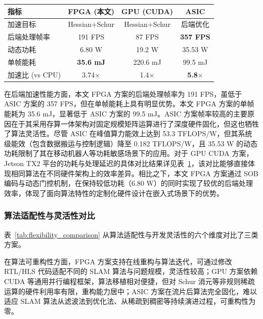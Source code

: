 \begin{table}[h!t]
\centering
{}
\label{tab:performance_comparison}
\scriptsize
\begin{tabular}{lccc}
\toprule
指标 & FPGA (本文) & GPU (CUDA) & ASIC\cite{Li2024SLAMCIM} \\
\midrule
加速目标 & Hessian+Schur & Hessian+Schur & 后端优化 \\
后端处理帧率 & 191 FPS & 87 FPS & \textbf{357 FPS} \\
动态功耗 & 6.80 W & 19.2 W & 35.53 W \\
单帧能耗 & \textbf{35.6 mJ} & 220.6 mJ & 99.5 mJ \\
加速比 (vs CPU) & 3.74$\times$ & 1.4$\times$ & \textbf{5.8$\times$} \\
\bottomrule
\end{tabular}
\end{table}

在后端加速性能方面，本文 FPGA 方案的后端处理帧率为 191 FPS，虽低于 ASIC 方案的 357 FPS，但在单帧能耗上具有明显优势。本文 FPGA 方案的单帧能耗为 35.6 mJ，显著低于 ASIC 方案的 99.5 mJ。ASIC 方案帧率较高的主要原因在于其采用存算一体架构对固定规模矩阵运算进行了深度硬件固化，但这也牺牲了算法灵活性。尽管 ASIC 在峰值算力能效上达到 53.3 TFLOPS/W，但其系统级能效（包含数据搬运与控制逻辑）降至 0.182 TFLOPS/W\cite{Li2024SLAMCIM}，且 35.53 W 的动态功耗限制了其在移动机器人等功耗敏感场景下的应用。对于 GPU CUDA 方案，Jetson TX2 平台的功耗与处理延迟的具体对比结果详见表~\ref{tab:performance_comparison}，该对比能够直接体现相同算法在不同硬件架构上的效率差异。相比之下，本文 FPGA 方案通过 SOB 编码与动态门控机制，在保持较低功耗（6.80 W）的同时实现了较优的后端处理效率，体现了面向算法特性的定制化硬件设计在嵌入式场景下的优势。

\subsubsection{算法适配性与灵活性对比}

表~\ref{tab:flexibility_comparison} 从算法适配性与开发灵活性的六个维度对比了三类方案。

在算法可重构性方面，FPGA 方案支持在线重构与算法迭代，可通过修改 RTL/HLS 代码适配不同的 SLAM 算法与问题规模，灵活性较高；GPU 方案依赖 CUDA 等通用并行编程框架，算法移植相对便捷，但对 Schur 消元等非规则稀疏运算的硬件利用率有限，重构能力居中；ASIC 方案在流片后算法完全固化，难以适应 SLAM 算法从滤波法到优化法、从稀疏到稠密等持续演进过程，可重构性为零。

